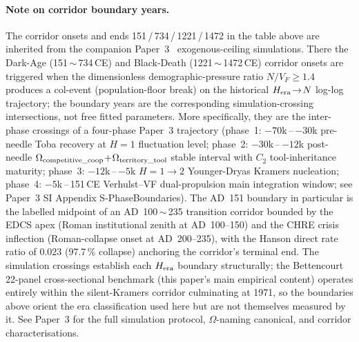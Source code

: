 \paragraph{Note on corridor boundary years.} The corridor onsets and ends 151\,/\,734\,/\,1221\,/\,1472 in the table above are inherited from the companion Paper~3~\cite{Kato2026c} exogenous-ceiling simulations. There the Dark-Age (151\,$\sim$\,734\,CE) and Black-Death (1221\,$\sim$\,1472\,CE) corridor onsets are triggered when the dimensionless demographic-pressure ratio $N/V_F\geq 1.4$ produces a col-event (population-floor break) on the historical $H_{\rm era}\!\to\!N$ log-log trajectory; the boundary years are the corresponding simulation-crossing intersections, not free fitted parameters. More specifically, they are the inter-phase crossings of a four-phase Paper~3 trajectory (phase~1: $-70$k\,--\,$-30$k pre-needle Toba recovery at $H{=}1$ fluctuation level; phase~2: $-30$k\,--\,$-12$k post-needle $\Omega_{\rm competitive\_coop}\!+\!\Omega_{\rm territory\_tool}$ stable interval with $C_2$ tool-inheritance maturity; phase~3: $-12$k\,--\,$-5$k $H{=}1\!\to\!2$ Younger-Dryas Kramers nucleation; phase~4: $-5$k\,--\,151\,CE Verhulst--VF dual-propulsion main integration window; see Paper~3 SI Appendix S-Phase\linebreak Boundaries). The AD~151 boundary in particular is the labelled midpoint of an AD~100\,$\sim$\,235 transition corridor bounded by the EDCS apex (Roman institutional zenith at AD~100--150) and the CHRE crisis inflection (Roman-collapse onset at AD~200--235), with the Hanson direct rate ratio of $0.023$ (97.7\,\% collapse) anchoring the corridor's terminal end. The simulation crossings establish each $H_{\rm era}$ boundary structurally; the Bettencourt 22-panel cross-sectional benchmark (this paper's main empirical content) operates entirely within the silent-Kramers corridor culminating at 1971, so the boundaries above orient the era classification used here but are not themselves measured by it. See Paper~3 for the full simulation protocol, $\Omega$-naming canonical, and corridor characterisations.

